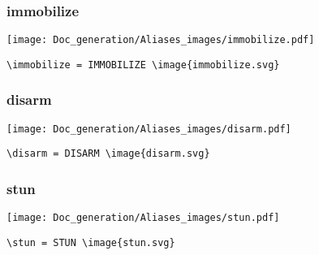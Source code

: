 \documentclass{article}
\begin{document}
\subsubsection{immobilize}
\begin{minipage}{0.45\linewidth}
\raggedright
\begin{spverbatim}
\immobilize 
\end{spverbatim}
\end{minipage}
\begin{minipage}{0.45\linewidth}
\raggedleft
\texttt{[image: Doc\_generation/Aliases\_images/immobilize.pdf]}
\end{minipage}
\begin{center}
\begin{BVerbatim}
\immobilize = IMMOBILIZE \image{immobilize.svg}
\end{BVerbatim}
\end{center}

\subsubsection{disarm}
\begin{minipage}{0.45\linewidth}
\raggedright
\begin{spverbatim}
\disarm 
\end{spverbatim}
\end{minipage}
\begin{minipage}{0.45\linewidth}
\raggedleft
\texttt{[image: Doc\_generation/Aliases\_images/disarm.pdf]}
\end{minipage}
\begin{center}
\begin{BVerbatim}
\disarm = DISARM \image{disarm.svg}
\end{BVerbatim}
\end{center}

\subsubsection{stun}
\begin{minipage}{0.45\linewidth}
\raggedright
\begin{spverbatim}
\stun 
\end{spverbatim}
\end{minipage}
\begin{minipage}{0.45\linewidth}
\raggedleft
\texttt{[image: Doc\_generation/Aliases\_images/stun.pdf]}
\end{minipage}
\begin{center}
\begin{BVerbatim}
\stun = STUN \image{stun.svg}
\end{BVerbatim}
\end{center}
\end{document}
